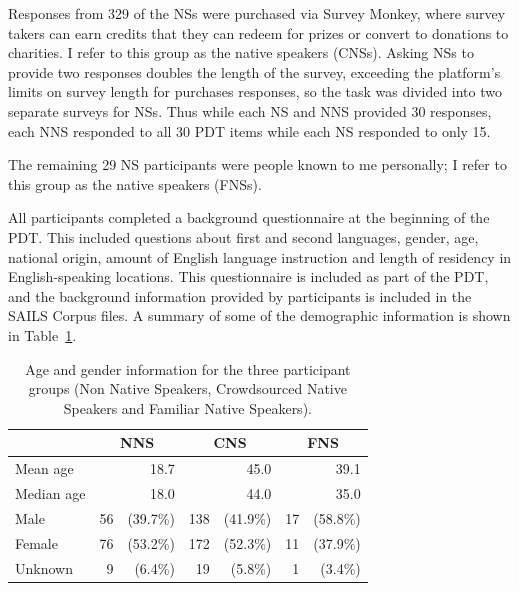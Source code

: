 Responses from 329 of the NSs were purchased via Survey Monkey, where survey takers can earn credits that they can redeem for prizes or convert to donations to charities. I refer to this group as the  native speakers (CNSs). Asking NSs to provide two responses doubles the length of the survey, exceeding the platform's limits on survey length for purchases responses, so the task was divided into two separate surveys for NSs. Thus while each NS and NNS provided 30 responses, each NNS responded to all 30 PDT items while each NS responded to only 15.

The remaining 29 NS participants were people known to me personally; I refer to this group as the  native speakers (FNSs).

All participants completed a background questionnaire at the beginning of the PDT. This included questions about first and second languages, gender, age, national origin, amount of English language instruction and length of residency in English-speaking locations. This questionnaire is included as part of the PDT, and the background information provided by participants is included in the SAILS Corpus files. A summary of some of the demographic information is shown in Table~\ref{tab:demographics}.

\begin{table}[htb!]
\begin{center}
\begin{tabular}{|l|rr|rr|rr|}
\hline
& \multicolumn{2}{|c|}{NNS} & \multicolumn{2}{|c|}{CNS} & \multicolumn{2}{|c|}{FNS} \\
\hline
\hline
Mean age & \multicolumn{2}{|r|}{18.7} & \multicolumn{2}{|r|}{45.0} & \multicolumn{2}{|r|}{39.1} \\
\hline
Median age & \multicolumn{2}{|r|}{18.0} & \multicolumn{2}{|r|}{44.0} & \multicolumn{2}{|r|}{35.0} \\
\hline
\hline
Male & 56 & (39.7\%) & 138 & (41.9\%) & 17 & (58.8\%) \\
\hline
Female & 76 & (53.2\%) & 172 & (52.3\%) & 11 & (37.9\%) \\
\hline
Unknown & 9 & (6.4\%) & 19 & (5.8\%) & 1 & (3.4\%) \\
\hline
\end{tabular}
\caption{\label{tab:demographics} Age and gender information for the three participant groups (Non Native Speakers, Crowdsourced Native Speakers and Familiar Native Speakers).}
\end{center}
\end{table}


